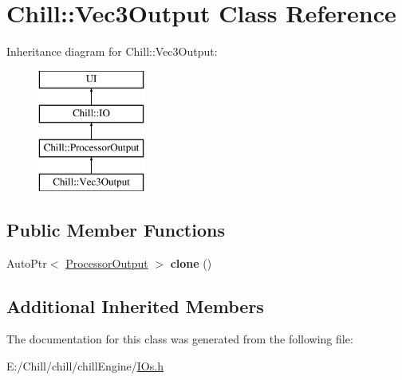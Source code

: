 \hypertarget{class_chill_1_1_vec3_output}{}\section{Chill\+:\+:Vec3\+Output Class Reference}
\label{class_chill_1_1_vec3_output}
Inheritance diagram for Chill\+:\+:Vec3\+Output\+:\begin{figure}[H]
\begin{center}
\leavevmode
\includegraphics[height=4.000000cm]{class_chill_1_1_vec3_output}
\end{center}
\end{figure}
\subsection*{Public Member Functions}
\begin{DoxyCompactItemize}
\item 
\mbox{\label{class_chill_1_1_vec3_output_a9a23ba7d29f8ea2d5704f892ce038ee8}} 
Auto\+Ptr$<$ \mbox{\hyperlink{class_chill_1_1_processor_output}{Processor\+Output}} $>$ {\bfseries clone} ()
\end{DoxyCompactItemize}
\subsection*{Additional Inherited Members}


The documentation for this class was generated from the following file\+:\begin{DoxyCompactItemize}
\item 
E\+:/\+Chill/chill/chill\+Engine/\mbox{\hyperlink{_i_os_8h}{I\+Os.\+h}}\end{DoxyCompactItemize}
